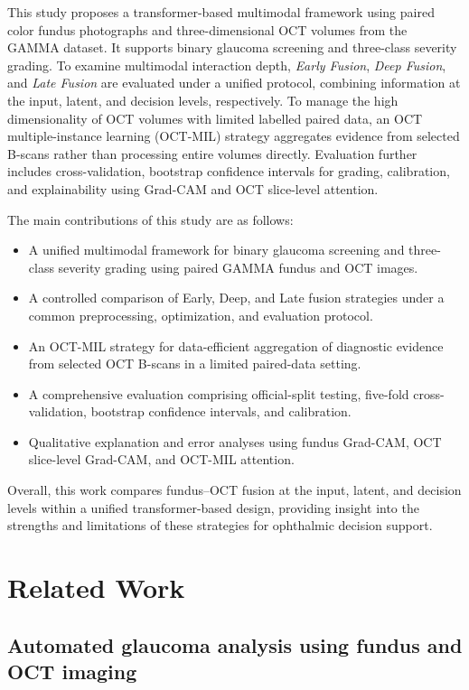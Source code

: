 \documentclass[sn-mathphys]{sn-jnl}%
\theoremstyle{thmstyleone}%
\theoremstyle{thmstyletwo}%
\theoremstyle{thmstylethree}%
\begin{document}
This study proposes a transformer-based multimodal framework using paired color fundus photographs and three-dimensional OCT volumes from the GAMMA dataset. It supports binary glaucoma screening and three-class severity grading. To examine multimodal interaction depth, \textit{Early Fusion}, \textit{Deep Fusion}, and \textit{Late Fusion} are evaluated under a unified protocol, combining information at the input, latent, and decision levels, respectively. To manage the high dimensionality of OCT volumes with limited labelled paired data, an OCT multiple-instance learning (OCT-MIL) strategy aggregates evidence from selected B-scans rather than processing entire volumes directly. Evaluation further includes cross-validation, bootstrap confidence intervals for grading, calibration, and explainability using Grad-CAM and OCT slice-level attention.

The main contributions of this study are as follows:
\begin{itemize}
    \item A unified multimodal framework for binary glaucoma screening and three-class severity grading using paired GAMMA fundus and OCT images.
    \item A controlled comparison of Early, Deep, and Late fusion strategies under a common preprocessing, optimization, and evaluation protocol.
    \item An OCT-MIL strategy for data-efficient aggregation of diagnostic evidence from selected OCT B-scans in a limited paired-data setting.
    \item A comprehensive evaluation comprising official-split testing, five-fold cross-validation, bootstrap confidence intervals, and calibration.
    \item Qualitative explanation and error analyses using fundus Grad-CAM, OCT slice-level Grad-CAM, and OCT-MIL attention.
\end{itemize}

Overall, this work compares fundus--OCT fusion at the input, latent, and decision levels within a unified transformer-based design, providing insight into the strengths and limitations of these strategies for ophthalmic decision support.


\section{Related Work}
\label{sec:related_work}

\subsection{Automated glaucoma analysis using fundus and OCT imaging}
\label{subsec:fundus_oct_glaucoma_analysis}
\end{document}

